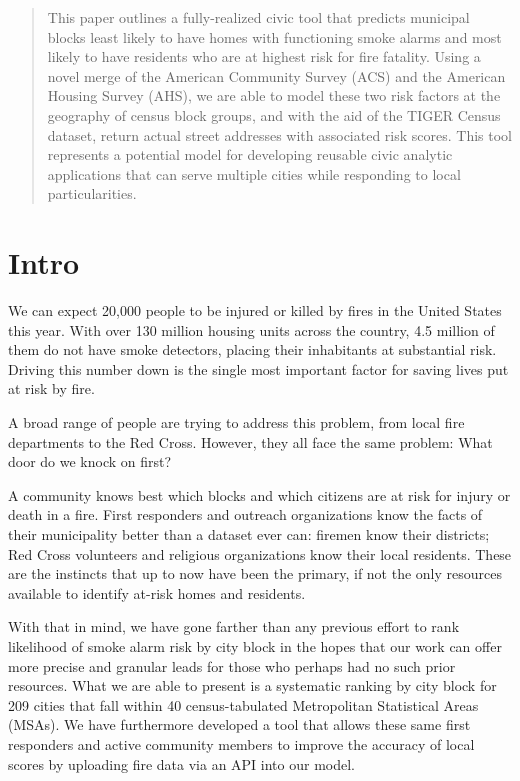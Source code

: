 \documentclass{sig-alternate}
\begin{document}
\maketitle
\begin{abstract}
This paper outlines a fully-realized civic tool that predicts municipal blocks least likely to have homes with functioning smoke alarms and most likely to have residents who are at highest risk for fire fatality. Using a novel merge of the American Community Survey (ACS) and the American Housing Survey (AHS), we are able to model these two risk factors at the geography of census block groups, and with the aid of the TIGER Census dataset, return actual street addresses with associated risk scores. This tool represents a potential model for developing reusable civic analytic applications that can serve multiple cities while responding to local particularities.
\end{abstract}



\section{Intro}
We can expect 20,000 people to be injured or killed by fires in the United States this year. With over 130 million housing units across the country, 4.5 million of them do not have smoke detectors, placing their inhabitants at substantial risk. Driving this number down is the single most important factor for saving lives put at risk by fire.

A broad range of people are trying to address this problem, from local fire departments to the Red Cross. However, they all face the same problem: What door do we knock on first?

A community knows best which blocks and which citizens are at risk for injury or death in a fire. First responders and outreach organizations know the facts of their municipality better than a dataset ever can: firemen know their districts; Red Cross volunteers and religious organizations know their local residents. These are the instincts that up to now have been the primary, if not the only resources available to identify at-risk homes and residents. 

With that in mind, we have gone farther than any previous effort to rank likelihood of smoke alarm risk by city block in the hopes that our work can offer more precise and granular leads for those who perhaps had no such prior resources. What we are able to present is a systematic ranking by city block for 209 cities that fall within 40 census-tabulated Metropolitan Statistical Areas (MSAs). We have furthermore developed a tool that allows these same first responders and active community members to improve the accuracy of local scores by uploading fire data via an API into our model.
\end{document}
